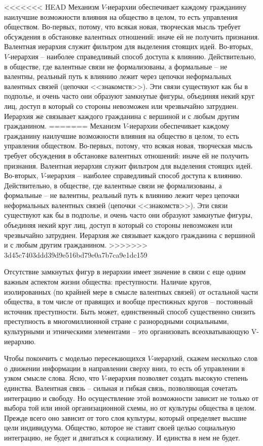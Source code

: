 \documentclass{book}
\begin{document}
<<<<<<< HEAD
Механизм $V$‑иерархии обеспечивает каждому гражданину наилучшие возможности влияния на общество в целом, то есть управления обществом. Во‑первых, потому, что всякая новая, творческая мысль требует обсуждения в обстановке валентных отношений: иначе ей не получить признания. Валентная иерархия служит фильтром для выделения стоящих идей. Во‑вторых, $V$‑иерархия -- наиболее справедливый  способ до­ступа к влиянию. Действительно, в обществе, где валентные связи не формализованы, а формальные -- не валентны, реальный путь к влиянию лежит через цепочки неформальных валентных связей (цепочки <<знакомств>>). Эти связи существуют как бы в подполье, и очень часто они образуют замкнутые фигуры, объе­диняя некий круг лиц, доступ в который со стороны невозможен или чрезвычайно затруднен. Иерархия же связывает каждого гражданина с вершиной и с любым другим гражданином.
=======
Механизм $V$-иерархии обеспечивает каждому гражданину наилучшие возможности влияния на общество в целом, то есть управления обществом. Во-первых, потому, что всякая новая, творческая мысль требует обсуждения в обстановке валентных отношений: иначе ей не получить признания. Валентная иерархия служит фильтром для выделения стоящих идей. Во-вторых, $V$-иерархия -- наиболее справедливый  способ до­ступа к влиянию. Действительно, в обществе, где валентные связи не формализованы, а формальные -- не валентны, реальный путь к влиянию лежит через цепочки неформальных валентных связей (цепочки <<знакомств>>). Эти связи существуют как бы в подполье, и очень часто они образуют замкнутые фигуры, объе­диняя некий круг лиц, доступ в который со стороны невозможен или чрезвычайно затруднен. Иерархия же связывает каждого гражданина с вершиной и с любым другим гражданином.
>>>>>>> 3d45c7403ddd39d9e516bd79e0a7b7ca9e1dc159

Отсутствие замкнутых фигур в иерархии имеет значение в свя­зи с еще одним важным аспектом жизни общества: преступно­сти. Наличие кругов, изолированных (по крайней мере в смыс­ле валентных связей) от остальной части общества, в том числе от правящих и вообще престижных кругов -- постоянный источ­ник преступности. Быть может, единственный способ существен­но снизить преступность в многомиллионной стране с разнород­ными социальными, культурными и этническими элементами -- это организовать всеохватывающую V-  иерархию.

Чтобы покончить с моделью пересекающихся $V$-иерархий, скажем несколько слов о движении информации в направлении сверху вниз, то есть об управлении в узком смысле слова. Ясно, что $V$-иерархия позволяет создать высокую степень единства. Валентная связь -- сильная и гибкая связь, позволяющая соче­тать интеграцию и свободу. Но осуществление этой возможности зависит не только от выбора той или иной организационной схемы, но от культуры общества в целом. Прежде всего оно зависит от того слоя культуры, который определяет высшие цели индивидуума. Общество, которое не ставит своей целью социальную интеграцию, не будет и двигаться к социализму. И единства в нем не будет.
\end{document}

